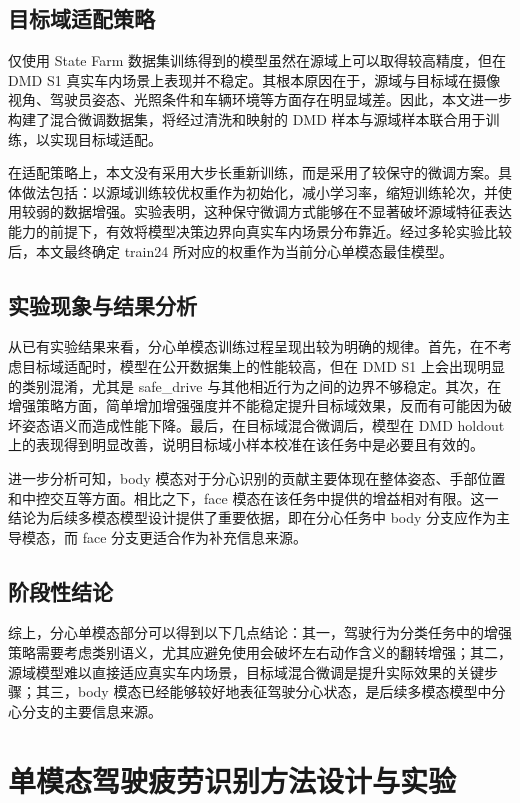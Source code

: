 \documentclass[12pt]{ctexrep}
\begin{document}
\section{目标域适配策略}
仅使用 State Farm 数据集训练得到的模型虽然在源域上可以取得较高精度，但在 DMD S1 真实车内场景上表现并不稳定。其根本原因在于，源域与目标域在摄像视角、驾驶员姿态、光照条件和车辆环境等方面存在明显域差。因此，本文进一步构建了混合微调数据集，将经过清洗和映射的 DMD 样本与源域样本联合用于训练，以实现目标域适配。

在适配策略上，本文没有采用大步长重新训练，而是采用了较保守的微调方案。具体做法包括：以源域训练较优权重作为初始化，减小学习率，缩短训练轮次，并使用较弱的数据增强。实验表明，这种保守微调方式能够在不显著破坏源域特征表达能力的前提下，有效将模型决策边界向真实车内场景分布靠近。经过多轮实验比较后，本文最终确定 train24 所对应的权重作为当前分心单模态最佳模型。

\section{实验现象与结果分析}
从已有实验结果来看，分心单模态训练过程呈现出较为明确的规律。首先，在不考虑目标域适配时，模型在公开数据集上的性能较高，但在 DMD S1 上会出现明显的类别混淆，尤其是 safe\_drive 与其他相近行为之间的边界不够稳定。其次，在增强策略方面，简单增加增强强度并不能稳定提升目标域效果，反而有可能因为破坏姿态语义而造成性能下降。最后，在目标域混合微调后，模型在 DMD holdout 上的表现得到明显改善，说明目标域小样本校准在该任务中是必要且有效的。

进一步分析可知，body 模态对于分心识别的贡献主要体现在整体姿态、手部位置和中控交互等方面。相比之下，face 模态在该任务中提供的增益相对有限。这一结论为后续多模态模型设计提供了重要依据，即在分心任务中 body 分支应作为主导模态，而 face 分支更适合作为补充信息来源。

\section{阶段性结论}
综上，分心单模态部分可以得到以下几点结论：其一，驾驶行为分类任务中的增强策略需要考虑类别语义，尤其应避免使用会破坏左右动作含义的翻转增强；其二，源域模型难以直接适应真实车内场景，目标域混合微调是提升实际效果的关键步骤；其三，body 模态已经能够较好地表征驾驶分心状态，是后续多模态模型中分心分支的主要信息来源。

\chapter{单模态驾驶疲劳识别方法设计与实验}
\end{document}
